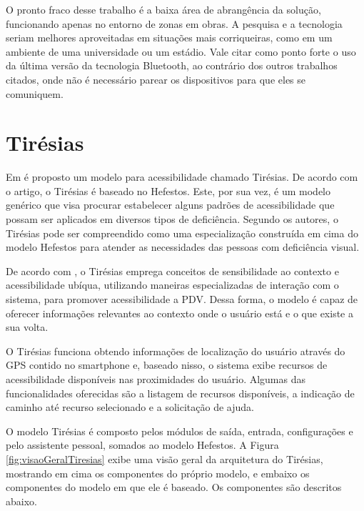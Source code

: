 \documentclass[english,brazilian]{UNISINOSmonografia}
\begin{document}
O pronto fraco desse trabalho é a baixa área de abrangência da solução, funcionando apenas no entorno de zonas em obras.
A pesquisa e a tecnologia seriam melhores aproveitadas em situações mais corriqueiras, como em um ambiente de uma universidade ou um estádio. Vale citar como ponto forte o uso da última versão da tecnologia Bluetooth, ao contrário dos outros trabalhos citados, onde não é necessário parear os dispositivos para que eles se comuniquem.

	\section{Tirésias}
Em  é proposto um modelo para acessibilidade chamado Tirésias. De acordo com o artigo, o Tirésias é baseado no Hefestos. Este, por sua vez, é um modelo genérico que visa procurar estabelecer alguns padrões de acessibilidade que possam ser aplicados em diversos tipos de deficiência. Segundo os autores, o Tirésias pode ser compreendido como uma especialização construída em cima do modelo Hefestos para atender as necessidades das pessoas com deficiência visual. 

De acordo com , o Tirésias emprega conceitos de sensibilidade ao contexto e acessibilidade ubíqua, utilizando maneiras especializadas de interação com o sistema, para promover acessibilidade a PDV. Dessa forma, o modelo é capaz de oferecer informações relevantes ao contexto onde o usuário está e o que existe a sua volta.

O Tirésias funciona obtendo informações de localização do usuário através do GPS contido no smartphone e, baseado nisso, o sistema exibe recursos de acessibilidade disponíveis nas proximidades do usuário. Algumas das funcionalidades oferecidas são a listagem de recursos disponíveis, a indicação de caminho até recurso selecionado e a solicitação de ajuda.

O modelo Tirésias é composto pelos módulos de saída, entrada, configurações e pelo assistente pessoal, somados ao modelo Hefestos. A Figura \ref{fig:visaoGeralTiresias} exibe uma visão geral da arquitetura do Tirésias, mostrando em cima os componentes do próprio modelo, e embaixo os componentes do modelo em que ele é baseado. Os componentes são descritos abaixo.
\end{document}
